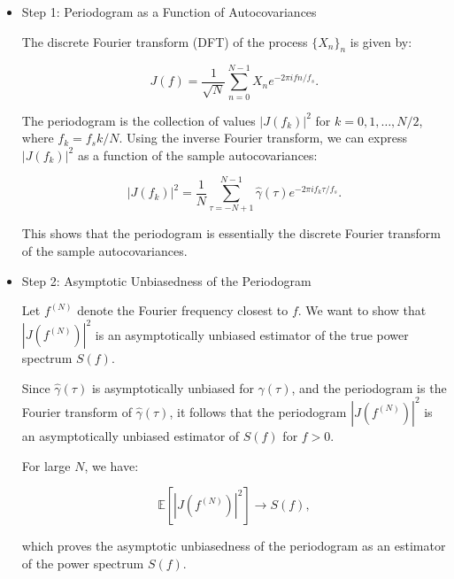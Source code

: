 \documentclass[11pt]{article}
\begin{document}
\begin{solution}

\begin{itemize}
    

\item Step 1: Periodogram as a Function of Autocovariances

The discrete Fourier transform (DFT) of the process \(\{X_n\}_n\) is given by:

\[
J(f) = \frac{1}{\sqrt{N}} \sum_{n=0}^{N-1} X_n e^{-2\pi i f n / f_s}.
\]

The periodogram is the collection of values \(|J(f_k)|^2\) for \(k = 0, 1, \dots, N/2\), where \(f_k = f_s k / N\). Using the inverse Fourier transform, we can express \(|J(f_k)|^2\) as a function of the sample autocovariances:

\[
|J(f_k)|^2 = \frac{1}{N} \sum_{\tau=-N+1}^{N-1} \hat{\gamma}(\tau) e^{-2\pi i f_k \tau / f_s}.
\]

This shows that the periodogram is essentially the discrete Fourier transform of the sample autocovariances.

\item Step 2: Asymptotic Unbiasedness of the Periodogram

Let \(f^{(N)}\) denote the Fourier frequency closest to \(f\). We want to show that \(|J(f^{(N)})|^2\) is an asymptotically unbiased estimator of the true power spectrum \(S(f)\).

Since \(\hat{\gamma}(\tau)\) is asymptotically unbiased for \(\gamma(\tau)\), and the periodogram is the Fourier transform of \(\hat{\gamma}(\tau)\), it follows that the periodogram \(|J(f^{(N)})|^2\) is an asymptotically unbiased estimator of \(S(f)\) for \(f > 0\).

For large \(N\), we have:

\[
\mathbb{E}[|J(f^{(N)})|^2] \to S(f),
\]

which proves the asymptotic unbiasedness of the periodogram as an estimator of the power spectrum \(S(f)\).
\end{itemize}

    
\end{solution}
\end{document}

